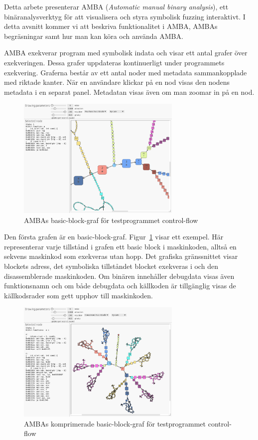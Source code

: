 Detta arbete presenterar AMBA (\emph{Automatic manual binary analysis}), ett
binäranalysverktyg för att visualisera och styra symbolisk fuzzing interaktivt.
I detta avsnitt kommer vi att beskriva funktionalitet i AMBA, AMBAs
begräsningar samt hur man kan köra och använda AMBA.

AMBA exekverar program med symbolisk indata och visar ett antal grafer
över exekveringen. Dessa grafer uppdateras kontinuerligt under programmets
exekvering. Graferna består av ett antal noder med metadata sammankopplade
med riktade kanter. När en användare klickar på en nod visas den nodens metadata
i en separat panel. Metadatan visas även om man zoomar in på en nod.

\begin{figure}
    \centering
    \includegraphics[width=0.7\textwidth]{figures/graph_basic_block.png}
    \caption{
        AMBAs basic-block-graf för testprogrammet control-flow
    }\label{fig:graf-basic}
\end{figure}

Den första grafen är en basic-block-graf. Figur~\ref{fig:graf-basic} visar ett
exempel. Här representerar varje tillstånd i grafen ett basic block i
maskinkoden, alltså en sekvens maskinkod som exekveras utan hopp. Det grafiska
gränssnittet visar blockets adress, det symboliska tillståndet blocket exekveras
i och den disassemblerade maskinkoden. Om binären innehåller debugdata visas
även funktionsnamn och om både debugdata och källkoden är tillgänglig visas de
källkodsrader som gett upphov till maskinkoden.

\begin{figure}
    \centering
    \includegraphics[width=0.7\textwidth]{figures/graph_block_compressed.png}
    \caption{
        AMBAs komprimerade basic-block-graf för testprogrammet control-flow
    }\label{fig:graf-compressed}
\end{figure}

